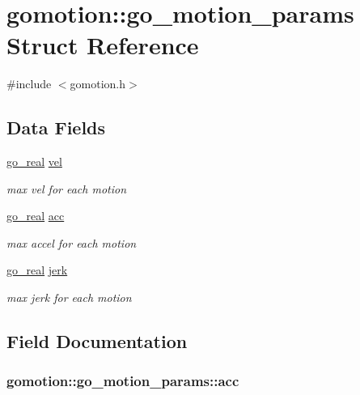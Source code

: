 \hypertarget{structgomotion_1_1go__motion__params}{\section{gomotion\-:\-:go\-\_\-motion\-\_\-params Struct Reference}
\label{structgomotion_1_1go__motion__params}
}


{\ttfamily \#include $<$gomotion.\-h$>$}

\subsection*{Data Fields}
\begin{DoxyCompactItemize}
\item 
\hyperlink{gotypes_8h_afd666a2393eebd71ee455846ac9def9b}{go\-\_\-real} \hyperlink{structgomotion_1_1go__motion__params_ad3121c36c5257557895df5d036b22c9d}{vel}
\begin{DoxyCompactList}\small\item\em max vel for each motion \end{DoxyCompactList}\item 
\hyperlink{gotypes_8h_afd666a2393eebd71ee455846ac9def9b}{go\-\_\-real} \hyperlink{structgomotion_1_1go__motion__params_a494815c0bc4016f78b82e2005ee6ad70}{acc}
\begin{DoxyCompactList}\small\item\em max accel for each motion \end{DoxyCompactList}\item 
\hyperlink{gotypes_8h_afd666a2393eebd71ee455846ac9def9b}{go\-\_\-real} \hyperlink{structgomotion_1_1go__motion__params_a25db76d9565efdc899bc8bc28b4a7c32}{jerk}
\begin{DoxyCompactList}\small\item\em max jerk for each motion \end{DoxyCompactList}\end{DoxyCompactItemize}


\subsection{Field Documentation}
\hypertarget{structgomotion_1_1go__motion__params_a494815c0bc4016f78b82e2005ee6ad70}{
\subsubsection[{acc}]{ gomotion\-::go\-\_\-motion\-\_\-params\-::acc}}\label{structgomotion_1_1go__motion__params_a494815c0bc4016f78b82e2005ee6ad70}


